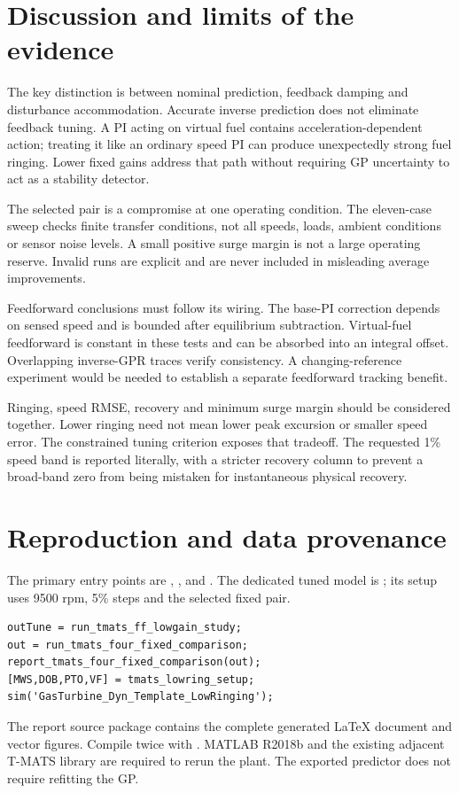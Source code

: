 \documentclass[11pt,a4paper]{article}
\begin{document}
\section{Discussion and limits of the evidence}
The key distinction is between nominal prediction, feedback damping and disturbance accommodation. Accurate inverse prediction does not eliminate feedback tuning. A PI acting on virtual fuel contains acceleration-dependent action; treating it like an ordinary speed PI can produce unexpectedly strong fuel ringing. Lower fixed gains address that path without requiring GP uncertainty to act as a stability detector.

The selected pair is a compromise at one operating condition. The eleven-case sweep checks finite transfer conditions, not all speeds, loads, ambient conditions or sensor noise levels. A small positive surge margin is not a large operating reserve. Invalid runs are explicit and are never included in misleading average improvements.

Feedforward conclusions must follow its wiring. The base-PI correction depends on sensed speed and is bounded after equilibrium subtraction. Virtual-fuel feedforward is constant in these tests and can be absorbed into an integral offset. Overlapping inverse-GPR traces verify consistency. A changing-reference experiment would be needed to establish a separate feedforward tracking benefit.

Ringing, speed RMSE, recovery and minimum surge margin should be considered together. Lower ringing need not mean lower peak excursion or smaller speed error. The constrained tuning criterion exposes that tradeoff. The requested 1\% speed band is reported literally, with a stricter recovery column to prevent a broad-band zero from being mistaken for instantaneous physical recovery.

\section{Reproduction and data provenance}
The primary entry points are , , and . The dedicated tuned model is ; its setup uses 9500 rpm, 5\% steps and the selected fixed pair.

\begin{verbatim}
outTune = run_tmats_ff_lowgain_study;
out = run_tmats_four_fixed_comparison;
report_tmats_four_fixed_comparison(out);
[MWS,DOB,PTO,VF] = tmats_lowring_setup;
sim('GasTurbine_Dyn_Template_LowRinging');
\end{verbatim}
The report source package contains the complete generated \LaTeX{} document and vector figures. Compile twice with . MATLAB R2018b and the existing adjacent T-MATS library are required to rerun the plant. The exported predictor does not require refitting the GP.
\end{document}
